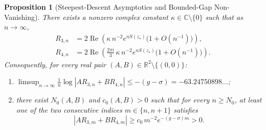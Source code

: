 \documentclass[11pt,reqno]{amsart}
\newtheorem{proposition}[theorem]{Proposition}
\theoremstyle{definition}
\theoremstyle{remark}
\newcommand{\RR}{\mathbb{R}}
\newcommand{\CC}{\mathbb{C}}
\begin{document}
\begin{proposition}[Steepest-Descent Asymptotics and Bounded-Gap Non-Vanishing]
\label{prop:asymp-nonvanish}
There exists a nonzero complex constant $\kappa \in \CC \setminus \{0\}$ such that as $n \to \infty$,
\begin{equation}
\label{eq:R3-R4-asymp}
\begin{aligned}
  R_{3,n} &= 2\operatorname{Re}\!\left(\kappa\, n^{-2} e^{n S(z_\star)} \bigl(1 + O(n^{-1})\bigr)\right), \\
  R_{4,n} &= 2\operatorname{Re}\!\left(\frac{2\pi i}{3}\,\kappa\, n^{-2} e^{n S(z_\star)} \bigl(1 + O(n^{-1})\bigr)\right).
\end{aligned}
\end{equation}
Consequently, for every real pair $(A, B) \in \RR^2 \setminus \{(0, 0)\}$:
\begin{enumerate}
  \item[\emph{(a)}] $\limsup_{n\to\infty} \frac{1}{n}\log|A R_{3,n} + B R_{4,n}| \le -(g - \sigma) = -63.24750898\ldots$;
  \item[\emph{(b)}] there exist $N_0(A, B)$ and $c_0(A, B) > 0$ such that for every $n \ge N_0$, at least one of the two consecutive indices $m \in \{n, n+1\}$ satisfies
  \begin{equation}
  \label{eq:bounded-gap}
    |A R_{3,m} + B R_{4,m}| \ge c_0\, m^{-2} e^{-(g - \sigma) m} > 0.
  \end{equation}
\end{enumerate}
\end{proposition}
\end{document}
